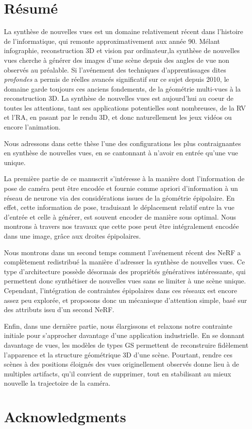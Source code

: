 \chapter{R\'esum\'e}

La synthèse de nouvelles vues est un domaine relativement récent dans l'histoire de l'informatique, qui remonte approximativement aux année 90. Mélant infographie, reconstruction 3D et vision par ordinateur,la synthèse de nouvelles vues cherche à générer des images d'une scène depuis des angles de vue non observés au préalable. Si l'avénement des techniques d'apprentissages dites \textit{profondes} a permis de réelles avancés significatif sur ce sujet depuis 2010, le domaine garde toujours ces anciens fondements, de la géométrie multi-vues à la reconstruction 3D. La synthèse de nouvelles vues est aujourd'hui au coeur de toutes les attentions, tant ses applications potentielles sont nombreuses, de la \ac{RV} et l'\ac{RA}, en pasant par le rendu 3D, et donc naturellement les jeux vidéos ou encore l'animation.

Nous adressons dans cette thèse l'une des configurations les plus contraignantes en synthèse de nouvelles vues, en se cantonnant à n'avoir en entrée qu'une vue unique. 

La première partie de ce manuscrit s'intéresse à la manière dont l'information de pose de caméra peut être encodée et fournie comme apriori d'information à un réseau de neurone via des considérations issues de la géométrie épipolaire. En effet, cette information de pose, traduisant le déplacement relatif entre la vue d'entrée et celle à générer, est souvent encoder de manière sous optimal. Nous montrons à travers nos travaux que cette pose peut être intégralement encodée dans une image, grâce aux droites épipolaires. 

Nous montrons dans un second temps comment l'avénement récent des \ac{NeRF} a complètement redistribué la manière d'adresser la synthèse de nouvelles vues. Ce type d'architecture possède désormais des propriétés génératives intéressante, qui permettent donc synthétiser de nouvelles vues sans se limiter à une scène unique. Cependant, l'intégration de contraintes épipolaires dans ces réseaux est encore assez peu explorée, et proposons donc un mécanisque d'attention simple, basé sur des attributs issu d'un second \ac{NeRF}. 

Enfin, dans une dernière partie, nous élargissons et relaxons notre contrainte initiale pour s'approcher davantage d'une application industrielle. En se donnant davantage de vues, les modèles de types \ac{GS} permettent de reconstruire fidèlement l'apparence et la structure géométrique 3D d'une scène. Pourtant, rendre ces scènes à des positions éloignés des vues originellement observés donne lieu à de multiples artifacts, qu'il convient de supprimer, tout en stabilisant au mieux nouvelle la trajectoire de la caméra. 


\cleardoublepage
\chapter{Acknowledgments}


